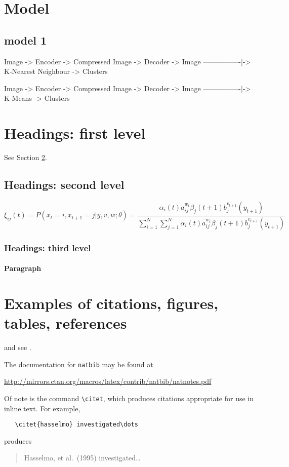 \documentclass{article}
\begin{document}
\section{Model}

\subsection{model 1}
Image -> Encoder -> Compressed Image -> Decoder -> Image
----------------|-> K-Nearest Neighbour -> Clusters

Image -> Encoder -> Compressed Image -> Decoder -> Image
----------------|-> K-Means -> Clusters

\section{Headings: first level}
\label{sec:headings}

\lipsum[4] See Section \ref{sec:headings}.

\subsection{Headings: second level}
\lipsum[5]
\begin{equation}
\xi _{ij}(t)=P(x_{t}=i,x_{t+1}=j|y,v,w;\theta)= {\frac {\alpha _{i}(t)a^{w_t}_{ij}\beta _{j}(t+1)b^{v_{t+1}}_{j}(y_{t+1})}{\sum _{i=1}^{N} \sum _{j=1}^{N} \alpha _{i}(t)a^{w_t}_{ij}\beta _{j}(t+1)b^{v_{t+1}}_{j}(y_{t+1})}}
\end{equation}

\subsubsection{Headings: third level}
\lipsum[6]

\paragraph{Paragraph}
\lipsum[7]

\section{Examples of citations, figures, tables, references}
\label{sec:others}
\lipsum[8] \cite{kour2014real,kour2014fast} and see \cite{hadash2018estimate}.

The documentation for \verb+natbib+ may be found at
\begin{center}
  \url{http://mirrors.ctan.org/macros/latex/contrib/natbib/natnotes.pdf}
\end{center}
Of note is the command \verb+\citet+, which produces citations
appropriate for use in inline text.  For example,
\begin{verbatim}
   \citet{hasselmo} investigated\dots
\end{verbatim}
produces
\begin{quote}
  Hasselmo, et al.\ (1995) investigated\dots
\end{quote}
\end{document}

